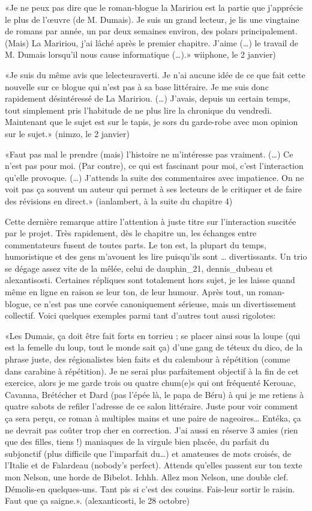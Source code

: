 \begin{Postface}
    «Je ne peux pas dire que le roman-blogue la Maririou est la partie que j’apprécie le plus de l’œuvre (de M. Dumais). Je suis un grand lecteur, je lis une vingtaine de romans par année, un par deux semaines environ, des polars principalement. (Mais) La Maririou, j’ai lâché après le premier chapitre. J’aime (…) le travail de M. Dumais lorsqu’il nous cause informatique (…).» wiiphone, le 2 janvier)

    «Je suis du même avis que lelecteuraverti. Je n’ai aucune idée de ce que fait cette nouvelle sur ce blogue qui n’est pas à sa base littéraire. Je me suis donc rapidement désintéressé de La Maririou. (…) J’avais, depuis un certain temps, tout simplement pris l’habitude de ne plus lire la chronique du vendredi. Maintenant que le sujet est sur le tapis, je sors du garde-robe avec mon opinion sur le sujet.» (nimzo, le 2 janvier)

    «Faut pas mal le prendre (mais) l’histoire ne m’intéresse pas vraiment. (…) Ce n’est pas pour moi. (Par contre), ce qui est fascinant pour moi, c’est l’interaction qu’elle provoque. (…) J’attends la suite des commentaires avec impatience. On ne voit pas ça souvent un auteur qui permet à ses lecteurs de le critiquer et de faire des révisions en direct.» (ianlambert, à la suite du chapitre 4)

Cette dernière remarque attire l’attention à juste titre sur l’interaction suscitée par le projet. Très rapidement, dès le chapitre un, les échanges entre commentateurs fusent de toutes parts. Le ton est, la plupart du temps, humoristique et des gens m’avouent les lire puisqu’ils sont … divertissants. Un trio se dégage assez vite de la mêlée, celui de dauphin_21, dennis_dubeau et alexantisosti. Certaines répliques sont totalement hors sujet, je les laisse quand même en ligne en raison se leur ton, de leur humour. Après tout, un roman-blogue, ce n’est pas une corvée canoniquement sérieuse, mais un divertissement collectif. Voici quelques exemples parmi tant d’autres tout aussi rigolotes:

    «Les Dumais, ça doit être fait forts en torrieu ; se placer ainsi sous la loupe (qui est la femelle du loup, tout le monde sait ça) d’une gang de téteux du dico, de la phrase juste, des régionalistes bien faits et du calembour à répétition (comme dans carabine à répétition). Je ne serai plus parfaitement objectif à la fin de cet exercice, alors je me garde trois ou quatre chum(e)s qui ont fréquenté Kerouac, Cavanna, Brétécher et Dard (pas l’épée là, le papa de Béru) à qui je me retiens à quatre sabots de refiler l’adresse de ce salon littéraire. Juste pour voir comment ça sera perçu, ce roman à multiples mains et une paire de nageoires… Entéka, ça ne devrait pas coûter trop cher en correction. J’ai aussi en réserve 3 amies (rien que des filles, tiens !) maniaques de la virgule bien placée, du parfait du subjonctif (plus difficile que l’imparfait du…) et amateuses de mots croisés, de l’Italie et de Falardeau (nobody’s perfect). Attends qu’elles passent sur ton texte mon Nelson, une horde de Bibelot. Ichhh. Allez mon Nelson, une double clef. Démolis-en quelques-uns. Tant pis si c’est des cousins. Fais-leur sortir le raisin. Faut que ça saigne.». (alexanticosti, le 28 octobre)


\end{Postface}
